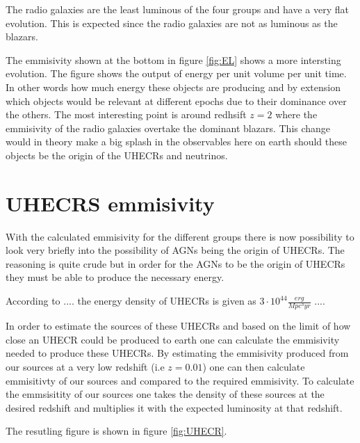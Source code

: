 \documentclass{article}
\begin{document}
The radio galaxies are the least luminous of the four groups and have a very flat evolution. This is expected since the radio galaxies are not as luminous as the blazars.

The emmisivity shown at the bottom in figure \ref{fig:EL} shows a more intersting evolution. The figure shows the output of energy per unit volume per unit time. In other words 
how much energy these objects are producing and by extension which objects would be relevant at different epochs due to their dominance over the others.
The most interesting point is around redhsift $z=2$ where the emmisivity of the radio galaxies overtake the dominant blazars. This change would in theory make
a big splash in the observables here on earth should these objects be the origin of the UHECRs and neutrinos. 



\section{UHECRS emmisivity}
With the calculated emmisivity for the different groups there is now possibility to look very briefly into the possibility of AGNs being the origin of UHECRs. The 
reasoning is quite crude but in order for the AGNs to be the origin of UHECRs they must be able to produce the necessary energy. 

According to .... the energy density of UHECRs is given as $3 \cdot 10^{44}\frac{erg}{Mpc^3yr}$ ....

In order to estimate the sources of these UHECRs and based on the limit of how close an UHECR could be produced to earth one can calculate the emmisivity needed to produce these UHECRs.
By estimating the emmisivity produced from our sources at a very low redshift (i.e $z=0.01$) one can then calculate emmisitivty of our sources and compared to the required emmisivity.
To calculate the emmsisitity of our sources one takes the density of these sources at the desired redshift and multiplies it with the expected luminosity at that redshift.

The resutling figure is shown in figure \ref{fig:UHECR}.
\end{document}
